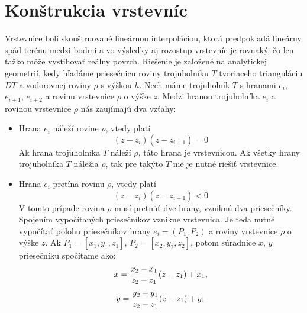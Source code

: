 \documentclass[11pt]{article}
\begin{document}
\section{Konštrukcia vrstevníc}
Vrstevnice boli skonštruované lineárnou interpoláciou, ktorá predpokladá lineárny spád terénu medzi bodmi a vo výsledky aj rozostup vrstevníc je rovnaký, čo len ťažko môže vystihovať reálny povrch. Riešenie je založené na analytickej geometrií, kedy hľadáme priesečnicu roviny \linebreak trojuholníku $T$ tvoriaceho trianguláciu $DT$ a vodorovnej roviny $\rho$ s výškou $h$.\newline
Nech máme trojuholník $T$ s hranami $e_{i}$, $e_{i+1}$, $e_{i+2}$ a rovinu vrstevnice $\rho$ o výške $z$. Medzi hranou trojuholníka $e_i$ a rovinou vrstevnice $\rho$ nás zaujímajú dva vzťahy:
\begin{itemize}
    \item \parindent Hrana $e_i$ náleží rovine $\rho$, vtedy platí
        \begin{equation*}
            (z - z_i)(z - z_{i+1})=0
        \end{equation*}
        Ak hrana trojuholníka $T$ náleží $\rho$, táto hrana je vrstevnicou. \newline
        Ak všetky hrany trojuholníka $T$ náležia $\rho$, tak pre takýto $T$ nie je nutné riešiť vrstevnice.
        
    \item \parindent Hrana $e_i$ pretína rovinu $\rho$, vtedy platí
        \begin{equation*}
            (z - z_i)(z - z_{i+1})<0
        \end{equation*}
        V tomto prípade rovina $\rho$ musí pretnúť dve hrany, vzniknú dva priesečníky. Spojením vypočítaných priesečníkov vznikne vrstevnica. Je teda nutné vypočítať polohu priesečníkov hrany $e_i = (P_1, P_2)$ a roviny vrstevnice $\rho$ o výške $z$. Ak $P_1 = [x_1, y_1, z_1]$, $P_2 = [x_2, y_2, z_2]$, potom súradnice $x$, $y$ priesečníku spočítame ako: 
            \begin{equation*}
            \openup 1ex
            \begin{gathered}
            x = \frac{x_2-x_1}{z_2-z_1}(z-z_1)+x_1,\\
            y = \frac{y_2-y_1}{z_2-z_1}(z-z_1)+y_1
            \end{gathered}
            \end{equation*}
        
\end{itemize}
\end{document}
